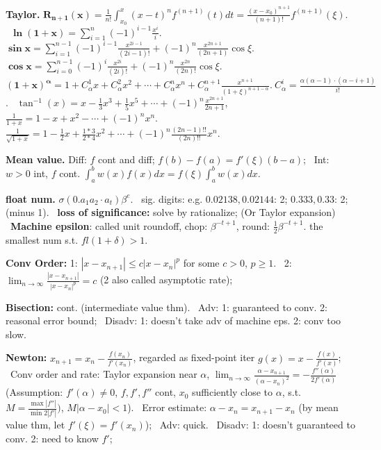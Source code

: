 
\usepackage{epstopdf}
\usepackage{graphics}
\usepackage{subfig}
\usepackage{listings}

\newcommand{\tb}{\textbf}


\tb{Taylor.} $\mathbf{R_{n+1}(x)} = \frac{1}{n!}\int_{x_0}^{x}(x-t)^nf^{(n+1)}(t)dt = \frac{(x-x_0)^{n+1}}{(n+1)!}f^{(n+1)}(\xi) $. ~$\mathbf{\ln(1+x)} = \sum_{i=1}^{n}(-1)^{i-1}\frac{x^i}{i} $. ~$\mathbf{\sin x} = \sum_{i=1}^{n-1}(-1)^{i-1}\frac{x^{2i-1}}{(2i-1)!}+(-1)^n\frac{x^{2n+1}}{(2n+1)}\cos\xi $. ~$\mathbf{\cos x} = \sum_{i=0}^{n-1}(-1)^{i}\frac{x^{2i}}{(2i)!}+(-1)^n\frac{x^{2n}}{(2n)!}\cos\xi $. ~$\mathbf{(1+x)^\alpha} = 1+C_{\alpha}^1x+C_{\alpha}^2x^2+\cdots+C_{\alpha}^nx^n+C_{\alpha}^{n+1}\frac{x^{n+1}}{(1+\xi)^{n+1-\alpha}}. ~C_\alpha^i = \frac{\alpha(\alpha-1)\cdot(\alpha-i+1)}{i!} $. ~$\tan^{-1}(x) = x-\frac{1}{3}x^3+\frac{1}{5}x^5+\cdots + (-1)^n\frac{x^{2n+1}}{2n+1} $, ~$\frac{1}{1+x} = 1-x+x^2-\cdots+(-1)^nx^n $. ~$\frac{1}{\sqrt{1+x}} = 1-\frac{1}{2}x+\frac{1*3}{2*4}x^2+\cdots +(-1)^n\frac{(2n-1)!!}{(2n)!!}x^n $.

\tb{Mean value.} Diff: $f$ cont and diff; $f(b)-f(a) = f'(\xi)(b-a)$; ~Int: $w > 0$ int, $f$ cont. $\int_a^bw(x)f(x)dx = f(\xi)\int_a^bw(x)dx $.

\tb{float num.} $\sigma(0.a_1a_2\cdot a_t)\beta^e$. ~sig. digits: e.g. $0.02138, 0.02144$: 2; $0.333, 0.33$: 2; (minus 1).
~\tb{loss of significance:} solve by rationalize; (Or Taylor expansion) ~\tb{Machine epsilon}: called unit roundoff, chop: $\beta^{-t+1} $, round: $\frac{1}{2}\beta^{-t+1} $. the smallest num s.t. $fl(1+\delta) > 1$.


\tb{Conv Order:} 1: $|x-x_{n+1}|\le c|x-x_{n}|^p $ for some $c > 0$, $p \ge 1$. ~2: $\lim_{n\to\infty}\frac{|x-x_{n+1}|}{|x-x_n|^p} = c $ (2 also called asymptotic rate);

\tb{Bisection:} cont. (intermediate value thm). ~Adv: 1: guaranteed to conv. 2: reasonal error bound; ~Disadv: 1: doesn't take adv of machine eps. 2: conv too slow.

\tb{Newton:} $x_{n+1} = x_n-\frac{f(x_n)}{f'(x_n)} $, regarded as fixed-point iter $g(x) = x - \frac{f(x)}{f'(x)}$; ~Conv order and rate: Taylor expansion near $\alpha$, $\lim_{n\to\infty}\frac{\alpha-x_{n+1}}{(\alpha-x_n)^2} = -\frac{f''(\alpha)}{2f'(\alpha)} $ (Assumption: $f'(\alpha)\ne 0$, $f, f', f''$ cont, $x_0 $ sufficiently close to $\alpha$, s.t. $M = \frac{\max|f''|}{\min2|f'|})$, $M|\alpha-x_0| < 1$). ~Error estimate: $\alpha-x_n = x_{n+1}-x_n $ (by mean value thm, let $f'(\xi) = f'(x_n)$); ~Adv: quick. ~Disadv: 1: doesn't guaranteed to conv. 2: need to know $f'$;

